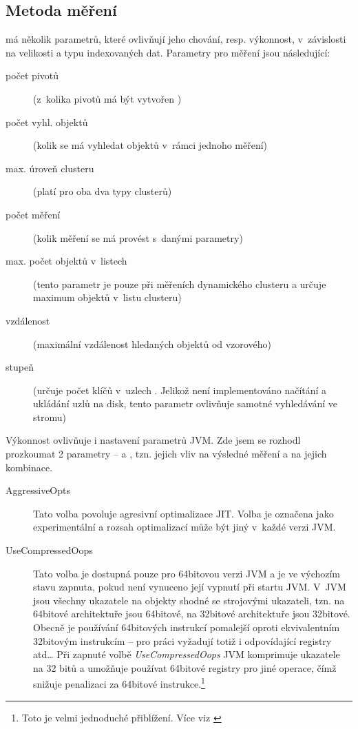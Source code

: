 \subsection{Metoda měření\label{sec:measurementmethod}}

\MIndex{} má několik parametrů, které ovlivňují jeho chování, resp. výkonnost, v~závislosti na velikosti a typu indexovaných dat.
Parametry pro měření jsou následující:
\begin{description}
\item[počet pivotů] (z~kolika pivotů má být vytvořen \MIndex{})
\item[počet vyhl. objektů] (kolik se má vyhledat objektů v~rámci jednoho měření)
\item[max. úroveň clusteru] (platí pro oba dva typy clusterů)
\item[počet měření] (kolik měření se má provést s~danými parametry)
\item[max. počet objektů v~listech] (tento parametr je pouze při měřeních dynamického clusteru a určuje maximum objektů v~listu clusteru)
\item[vzdálenost] (maximální vzdálenost hledaných objektů od vzorového)
\item[stupeň \BPTree{}] (určuje počet klíčů v~uzlech \BPTree{}. Jelikož není implementováno načítání a ukládání uzlů na disk, tento parametr ovlivňuje samotné vyhledávání ve stromu)
\end{description}

Výkonnost  ovlivňuje i nastavení parametrů JVM.
Zde jsem se rozhodl prozkoumat 2 parametry --  a , tzn. jejich vliv na výsledné měření a na jejich kombinace.

\begin{description}
\item[AggressiveOpts] Tato volba povoluje agresivní optimalizace JIT.
Volba je označena jako experimentální a rozsah optimalizací může být jiný v~každé verzi JVM.
\item[UseCompressedOops] Tato volba je dostupná pouze pro 64bitovou verzi JVM a je ve výchozím stavu zapnuta, pokud není vynuceno její vypnutí při startu JVM.
V~JVM jsou všechny ukazatele na objekty shodné se strojovými ukazateli, tzn. na 64bitové architektuře jsou 64bitové, na 32bitové architektuře jsou 32bitové.
Obecně je používání 64bitových instrukcí pomalejší oproti ekvivalentním 32bitovým instrukcím -- pro práci vyžadují totiž i odpovídající registry atd\ldots{}
Při zapnuté volbě \emph{UseCompressedOops} JVM komprimuje ukazatele na 32 bitů a umožňuje používat 64bitové registry pro jiné operace, čímž snižuje penalizaci za 64bitové instrukce.\footnote{Toto je velmi jednoduché přiblížení. Více viz \cite{hunt2011java}}
\end{description}



